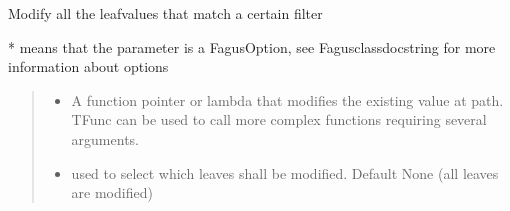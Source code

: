 \documentclass[a4paper,10pt,english]{sphinxmanual}
\begin{document}
\begin{fulllineitems}
\begin{fulllineitems}
\label{\detokenize{fagus.fagus:fagus.fagus.Fagus.mod_all}}
\pysigstartsignatures
{}
\pysigstopsignatures
\sphinxAtStartPar
Modify all the leaf\sphinxhyphen{}values that match a certain filter

\sphinxAtStartPar
* means that the parameter is a FagusOption, see Fagus\sphinxhyphen{}class\sphinxhyphen{}docstring for more information about options
\begin{quote}\begin{description}
\begin{itemize}
\item {}
\sphinxAtStartPar
{} \textendash{} A function pointer or lambda that modifies the existing value at path. TFunc can be used to
call more complex functions requiring several arguments.

\item {}
\sphinxAtStartPar
{} \textendash{} used to select which leaves shall be modified. Default None (all leaves are modified)


\end{itemize}
\end{description}
\end{quote}
\end{fulllineitems}
\end{fulllineitems}
\end{document}
